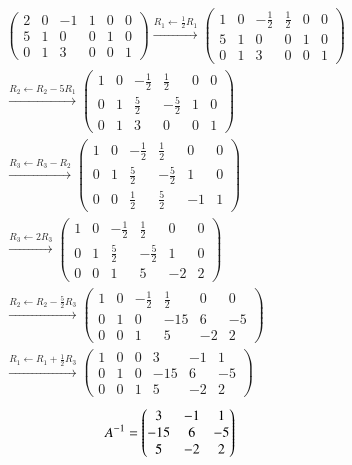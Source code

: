 \documentclass[journal]{IEEEtran}
\begin{document}
\begin{align}
&\left(
\begin{array}{ccc|ccc}
2 & 0 & -1 & 1 & 0 & 0 \\
5 & 1 & 0 & 0 & 1 & 0 \\
0 & 1 & 3 & 0 & 0 & 1
\end{array}
\right)
\xrightarrow{R_1 \gets \frac{1}{2}R_1}
\left(
\begin{array}{ccc|ccc}
1 & 0 & -\frac{1}{2} & \frac{1}{2} & 0 & 0 \\
5 & 1 & 0 & 0 & 1 & 0 \\
0 & 1 & 3 & 0 & 0 & 1
\end{array}
\right) \\[12pt]
&\xrightarrow{R_2 \gets R_2 - 5R_1}
\left(
\begin{array}{ccc|ccc}
1 & 0 & -\frac{1}{2} & \frac{1}{2} & 0 & 0 \\
0 & 1 & \frac{5}{2} & -\frac{5}{2} & 1 & 0 \\
0 & 1 & 3 & 0 & 0 & 1
\end{array}
\right) \\[12pt]
&\xrightarrow{R_3 \gets R_3 - R_2}
\left(
\begin{array}{ccc|ccc}
1 & 0 & -\frac{1}{2} & \frac{1}{2} & 0 & 0 \\
0 & 1 & \frac{5}{2} & -\frac{5}{2} & 1 & 0 \\
0 & 0 & \frac{1}{2} & \frac{5}{2} & -1 & 1
\end{array}
\right) \\[12pt]
&\xrightarrow{R_3 \gets 2R_3}
\left(
\begin{array}{ccc|ccc}
1 & 0 & -\frac{1}{2} & \frac{1}{2} & 0 & 0 \\
0 & 1 & \frac{5}{2} & -\frac{5}{2} & 1 & 0 \\
0 & 0 & 1 & 5 & -2 & 2
\end{array}
\right) \\[12pt]
&\xrightarrow{R_2 \gets R_2 - \frac{5}{2}R_3}
\left(
\begin{array}{ccc|ccc}
1 & 0 & -\frac{1}{2} & \frac{1}{2} & 0 & 0 \\
0 & 1 & 0 & -15 & 6 & -5 \\
0 & 0 & 1 & 5 & -2 & 2
\end{array}
\right) \\[12pt]
&\xrightarrow{R_1 \gets R_1 + \frac{1}{2}R_3}
\left(
\begin{array}{ccc|ccc}
1 & 0 & 0 & 3 & -1 & 1 \\
0 & 1 & 0 & -15 & 6 & -5 \\
0 & 0 & 1 & 5 & -2 & 2
\end{array}
\right)
\end{align}
\begin{align}
A^{-1}
   =\begin{pmatrix}3 & -1 & 1
          \\
        -15 & 6 & -5
         \\
        5 & -2 & 2
\end{pmatrix}
\end{align}
\end{document}
